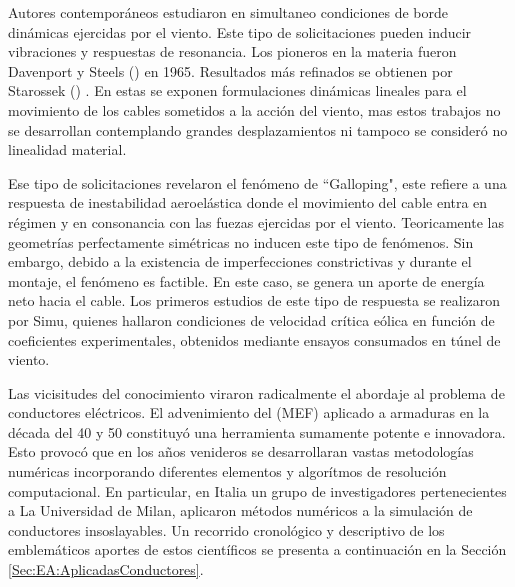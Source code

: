 Autores contemporáneos estudiaron en simultaneo condiciones de borde dinámicas ejercidas por el viento. Este tipo de solicitaciones pueden inducir vibraciones y respuestas de resonancia. Los pioneros en la materia fueron Davenport y Steels (\citep{Davenport1965}) en 1965. Resultados más refinados se obtienen por Starossek (\cite{Starossek1991}) . En estas se exponen formulaciones dinámicas lineales para el movimiento de los cables sometidos a la acción del viento, mas estos trabajos no se desarrollan contemplando grandes desplazamientos ni tampoco se consideró no linealidad material. 

Ese tipo de solicitaciones revelaron el fenómeno de ``Galloping", este refiere a una respuesta de inestabilidad aeroelástica donde el movimiento del cable entra en régimen y en consonancia con las fuezas ejercidas por el viento. Teoricamente las geometrías perfectamente simétricas no inducen este tipo de fenómenos. Sin embargo, debido a la existencia de imperfecciones constrictivas y durante el montaje, el fenómeno es factible. En este caso, se genera un aporte de energía neto hacia el cable. Los primeros estudios de este tipo de respuesta se realizaron por Simu, quienes hallaron condiciones de velocidad crítica eólica en función de coeficientes experimentales, obtenidos mediante ensayos consumados en túnel de viento. \citep{Simiu1986}

Las vicisitudes del conocimiento viraron radicalmente el abordaje al problema de conductores eléctricos. El advenimiento del (\gls{MEF}) aplicado a armaduras en la década del 40 y 50 constituyó una herramienta sumamente potente e innovadora. Esto provocó que en los años venideros se desarrollaran vastas metodologías numéricas incorporando diferentes elementos y algorítmos de resolución computacional. En particular, en Italia un grupo de investigadores pertenecientes a La Universidad de Milan, aplicaron métodos numéricos a la simulación de conductores insoslayables. Un recorrido cronológico y descriptivo de los emblemáticos aportes de estos científicos se presenta a continuación en la Sección \ref{Sec:EA:AplicadasConductores}.

